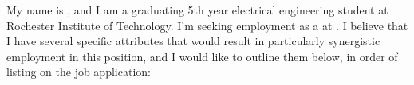 My name is \name, and I am a graduating 5th year electrical engineering 
student at Rochester Institute of Technology. I'm seeking employment 
as a \targetpos at \company. I believe that I have several specific 
attributes that would result in particularly synergistic employment in 
this position, and I would like to outline them below, in order of 
listing on the job application: